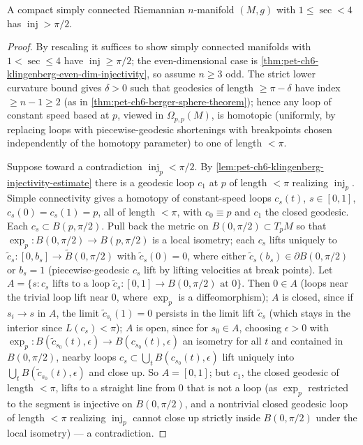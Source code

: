 \begin{theorem}
  \label{thm:pet-ch6-klingenberg-pinching-injectivity}
  A compact simply connected Riemannian $n$-manifold $(M,g)$ with
  $1\le\sec<4$ has $\operatorname{inj}>\pi/2$.
\end{theorem}
\begin{proof}
  By rescaling it suffices to show simply connected manifolds with
  $1<\sec\le4$ have $\operatorname{inj}\ge\pi/2$; the even-dimensional case is
  \cref{thm:pet-ch6-klingenberg-even-dim-injectivity}, so assume $n\ge3$ odd.
  The strict lower curvature bound gives $\delta>0$ such that geodesics of
  length $\ge\pi-\delta$ have index $\ge n-1\ge2$ (as in
  \cref{thm:pet-ch6-berger-sphere-theorem}); hence any loop of constant speed
  based at $p$, viewed in $\Omega_{p,p}(M)$, is homotopic (uniformly, by
  replacing loops with piecewise-geodesic shortenings with breakpoints chosen
  independently of the homotopy parameter) to one of length $<\pi$.

  Suppose toward a contradiction $\operatorname{inj}_p<\pi/2$. By
  \cref{lem:pet-ch6-klingenberg-injectivity-estimate} there is a geodesic
  loop $c_1$ at $p$ of length $<\pi$ realizing $\operatorname{inj}_p$. Simple
  connectivity gives a homotopy of constant-speed loops
  $c_s(t)$, $s\in[0,1]$, $c_s(0)=c_s(1)=p$, all of length $<\pi$, with
  $c_0\equiv p$ and $c_1$ the closed geodesic. Each $c_s\subset B(p,\pi/2)$.
  Pull back the metric on $B(0,\pi/2)\subset T_pM$ so that
  $\exp_p:B(0,\pi/2)\to B(p,\pi/2)$ is a local isometry; each $c_s$ lifts
  uniquely to $\tilde c_s:[0,b_s]\to \tilde B(0,\pi/2)$ with $\tilde c_s(0)=0$,
  where either $\tilde c_s(b_s)\in\partial B(0,\pi/2)$ or $b_s=1$
  (piecewise-geodesic $c_s$ lift by lifting velocities at break points). Let
  $A=\{s: c_s\text{ lifts to a loop }\tilde c_s:[0,1]\to B(0,\pi/2)\text{ at
  }0\}$. Then $0\in A$ (loops near the trivial loop lift near $0$, where
  $\exp_p$ is a diffeomorphism); $A$ is closed, since if $s_i\to s$ in $A$,
  the limit $\tilde c_{s_i}(1)=0$ persists in the limit lift $\tilde c_s$
  (which stays in the interior since $L(c_s)<\pi$); $A$ is open, since for
  $s_0\in A$, choosing $\epsilon>0$ with $\exp_p:B(\tilde
  c_{s_0}(t),\epsilon)\to B(c_{s_0}(t),\epsilon)$ an isometry for all $t$ and
  contained in $B(0,\pi/2)$, nearby loops $c_s\subset\bigcup_tB(c_{s_0}(t),
  \epsilon)$ lift uniquely into $\bigcup_tB(\tilde c_{s_0}(t),\epsilon)$ and
  close up. So $A=[0,1]$; but $c_1$, the closed geodesic of length $<\pi$,
  lifts to a straight line from $0$ that is not a loop (as $\exp_p$
  restricted to the segment is injective on $B(0,\pi/2)$, and a nontrivial
  closed geodesic loop of length $<\pi$ realizing $\operatorname{inj}_p$ cannot close up
  strictly inside $B(0,\pi/2)$ under the local isometry) — a contradiction.
\end{proof}

